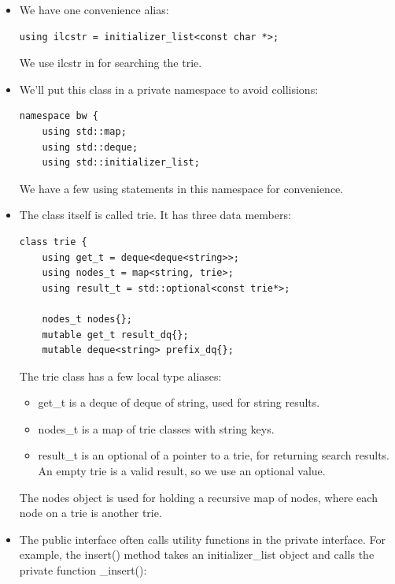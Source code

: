 \begin{itemize}
\item 
We have one convenience alias:

\begin{lstlisting}[style=styleCXX]
using ilcstr = initializer_list<const char *>;
\end{lstlisting}

We use ilcstr in for searching the trie.

\item 
We'll put this class in a private namespace to avoid collisions:

\begin{lstlisting}[style=styleCXX]
namespace bw {
	using std::map;
	using std::deque;
	using std::initializer_list;
\end{lstlisting}

We have a few using statements in this namespace for convenience.

\item 
The class itself is called trie. It has three data members:

\begin{lstlisting}[style=styleCXX]
class trie {
	using get_t = deque<deque<string>>;
	using nodes_t = map<string, trie>;
	using result_t = std::optional<const trie*>;
	
	nodes_t nodes{};
	mutable get_t result_dq{};
	mutable deque<string> prefix_dq{};
\end{lstlisting}

The trie class has a few local type aliases:

\begin{itemize}
\item 
get\_t is a deque of deque of string, used for string results.

\item 
nodes\_t is a map of trie classes with string keys.

\item 
result\_t is an optional of a pointer to a trie, for returning search results. An empty trie is a valid result, so we use an optional value.
\end{itemize}

The nodes object is used for holding a recursive map of nodes, where each node on a trie is another trie.

\item 
The public interface often calls utility functions in the private interface. For example, the insert() method takes an initializer\_list object and calls the private function \_insert():


\end{itemize}
